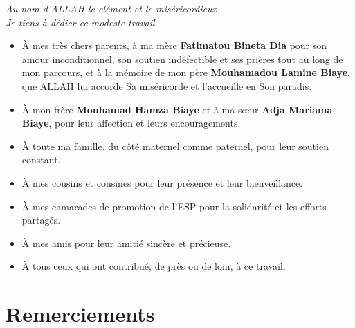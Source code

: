 \documentclass[a4paper,12pt]{report}
\begin{document}
\vspace{1cm}

\begin{center}
\begin{minipage}{0.9\textwidth}

\textit{Au nom d'ALLAH le clément et le miséricordieux}\\[0.5cm]
\textit{Je tiens à dédier ce modeste travail}

\vspace{0.8cm}

\begin{itemize}
  \setlength\itemsep{0.5em}

  \item À mes très chers parents, à ma mère \textbf{Fatimatou Bineta Dia}
  pour son amour inconditionnel, son soutien indéfectible et ses prières
  tout au long de mon parcours, et à la mémoire de mon père
  \textbf{Mouhamadou Lamine Biaye}, que ALLAH lui accorde Sa miséricorde
  et l’accueille en Son paradis.

  \item À mon frère \textbf{Mouhamad Hamza Biaye} et à ma sœur
  \textbf{Adja Mariama Biaye}, pour leur affection et leurs encouragements.

  \item À toute ma famille, du côté maternel comme paternel, pour leur soutien constant.

  \item À mes cousins et cousines pour leur présence et leur bienveillance.

  \item À mes camarades de promotion de l’ESP pour la solidarité et les efforts partagés.

  \item À mes amis pour leur amitié sincère et précieuse.

  \item À tous ceux qui ont contribué, de près ou de loin, à ce travail.

\end{itemize}

\end{minipage}
\end{center}

\cleardoublepage

\chapter*{Remerciements}
{}
\end{document}
